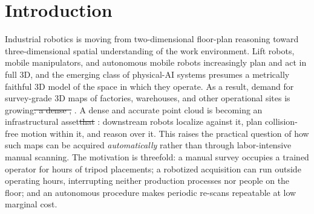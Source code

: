 \documentclass[sensors,article,submit,pdftex,moreauthors]{Definitions/mdpi}
\providecommand{\DIFadd}[1]{{\protect\color{blue} \sf #1}} %
\providecommand{\DIFdel}[1]{{\protect\color{red}\protect\scriptsize\protect\sout{#1}}} %
\providecommand{\DIFaddbegin}{} %
\providecommand{\DIFaddend}{} %
\providecommand{\DIFdelbegin}{} %
\providecommand{\DIFdelend}{} %
\begin{document}

\section{Introduction}

Industrial robotics is moving from two-dimensional floor-plan reasoning toward
three-dimensional spatial understanding of the work environment. Lift robots,
mobile manipulators, and autonomous mobile robots increasingly plan and act in
full 3D, and the emerging class of physical-AI systems presumes a metrically
faithful 3D model of the space in which they operate. As a result, demand for
survey-grade 3D maps of factories, warehouses, and other operational sites is
growing\DIFdelbegin \DIFdel{: a dense , }\DIFdelend \DIFaddbegin \DIFadd{. A dense and }\DIFaddend accurate point cloud is becoming an infrastructural
asset\DIFdelbegin \DIFdel{that
}\DIFdelend \DIFaddbegin \DIFadd{: }\DIFaddend downstream robots localize against \DIFaddbegin \DIFadd{it}\DIFaddend , plan collision-free motion within
\DIFaddbegin \DIFadd{it}\DIFaddend , and reason over \DIFaddbegin \DIFadd{it}\DIFaddend . This raises the practical question of how such maps can be acquired
\emph{automatically} rather than through labor-intensive manual scanning. \DIFaddbegin \DIFadd{The
motivation is threefold: a manual survey occupies a trained operator for hours
of tripod placements; a robotized acquisition can run outside operating hours,
interrupting neither production processes nor people on the floor; and an
autonomous procedure makes periodic re-scans repeatable at low marginal
cost.
}\DIFaddend 
\end{document}

